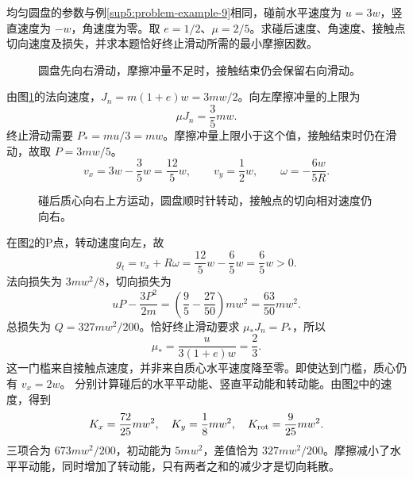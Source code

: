 \begin{exercise}[粗糙碰撞的滑动分支]\label{deep5:problem-exercise-9}
均匀圆盘的参数与例\ref{sup5:problem-example-9}相同，碰前水平速度为 $u=3w$，竖直速度为 $-w$，角速度为零。取 $e=1/2$、$\mu=2/5$。求碰后速度、角速度、接触点切向速度及损失，并求本题恰好终止滑动所需的最小摩擦因数。
\end{exercise}
\begin{figure}[H]\centering
{}
\caption{圆盘先向右滑动，摩擦冲量不足时，接触结束仍会保留右向滑动。}\label{deep5:fig:d4-h9-q}
\end{figure}
\begin{solution}
由图\ref{deep5:fig:d4-h9-q}的法向速度，$J_n=m(1+e)w=3mw/2$。向左摩擦冲量的上限为
\begin{equation}
 \mu J_n=\frac35mw.
\end{equation}
终止滑动需要 $P_*=mu/3=mw$。摩擦冲量上限小于这个值，接触结束时仍在滑动，故取 $P=3mw/5$。
\begin{equation}
 v_x=3w-\frac35w=\frac{12}{5}w,\qquad
 v_y=\frac12w,\qquad
 \omega=-\frac{6w}{5R}.
\end{equation}
\begin{figure}[H]\centering
{}
\caption{碰后质心向右上方运动，圆盘顺时针转动，接触点的切向相对速度仍向右。}\label{deep5:fig:d4-h9-s}
\end{figure}
在图\ref{deep5:fig:d4-h9-s}的P点，转动速度向左，故
\begin{equation}
 g_t=v_x+R\omega=\frac{12}{5}w-\frac65w=\frac65w>0.
\end{equation}
法向损失为 $3mw^2/8$，切向损失为
\begin{equation}
 uP-\frac{3P^2}{2m}
 =\left(\frac95-\frac{27}{50}\right)mw^2
 =\frac{63}{50}mw^2.
\end{equation}
总损失为 $Q=327mw^2/200$。恰好终止滑动要求 $\mu_*J_n=P_*$，所以
\begin{equation}
 \mu_* =\frac{u}{3(1+e)w}=\frac23.
\end{equation}
这一门槛来自接触点速度，并非来自质心水平速度降至零。即使达到门槛，质心仍有 $v_x=2w$。
分别计算碰后的水平平动能、竖直平动能和转动能。由图\ref{deep5:fig:d4-h9-s}中的速度，得到
\[
K_x=\frac{72}{25}mw^2,\quad K_y=\frac18mw^2,
\quad K_{\rm rot}=\frac9{25}mw^2.
\]
三项合为 $673mw^2/200$，初动能为 $5mw^2$，差值恰为 $327mw^2/200$。摩擦减小了水平平动能，同时增加了转动能，只有两者之和的减少才是切向耗散。

\end{solution}


